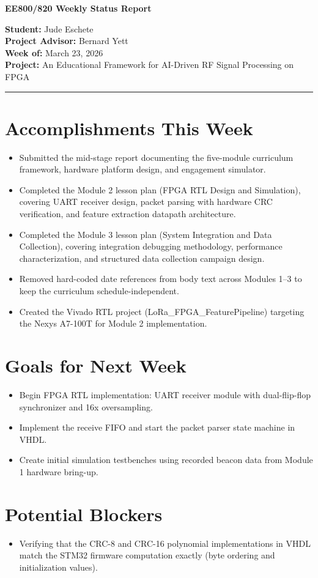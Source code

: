 \documentclass[10pt]{article}
\begin{document}
	\begin{center}
		{\Large\textbf{EE800/820 Weekly Status Report}}
	\end{center}

	\vspace{0.5em}

	\noindent\textbf{Student:} Jude Eschete\\
	\noindent\textbf{Project Advisor:} Bernard Yett\\
	\textbf{Week of:} March 23, 2026\\
	\textbf{Project:} An Educational Framework for AI-Driven RF Signal Processing on FPGA

	\vspace{1em}
	\hrule
	\vspace{1em}

	\section*{Accomplishments This Week}

	\begin{itemize}[noitemsep]
		\item Submitted the mid-stage report documenting the five-module curriculum framework, hardware platform design, and engagement simulator.
		\item Completed the Module 2 lesson plan (FPGA RTL Design and Simulation), covering UART receiver design, packet parsing with hardware CRC verification, and feature extraction datapath architecture.
		\item Completed the Module 3 lesson plan (System Integration and Data Collection), covering integration debugging methodology, performance characterization, and structured data collection campaign design.
		\item Removed hard-coded date references from body text across Modules 1--3 to keep the curriculum schedule-independent.
		\item Created the Vivado RTL project (LoRa\_FPGA\_FeaturePipeline) targeting the Nexys A7-100T for Module 2 implementation.
	\end{itemize}

	\section*{Goals for Next Week}

	\begin{itemize}[noitemsep]
		\item Begin FPGA RTL implementation: UART receiver module with dual-flip-flop synchronizer and 16x oversampling.
		\item Implement the receive FIFO and start the packet parser state machine in VHDL.
		\item Create initial simulation testbenches using recorded beacon data from Module 1 hardware bring-up.
	\end{itemize}

	\section*{Potential Blockers}

	\begin{itemize}[noitemsep]
		\item Verifying that the CRC-8 and CRC-16 polynomial implementations in VHDL match the STM32 firmware computation exactly (byte ordering and initialization values).
	\end{itemize}
\end{document}
